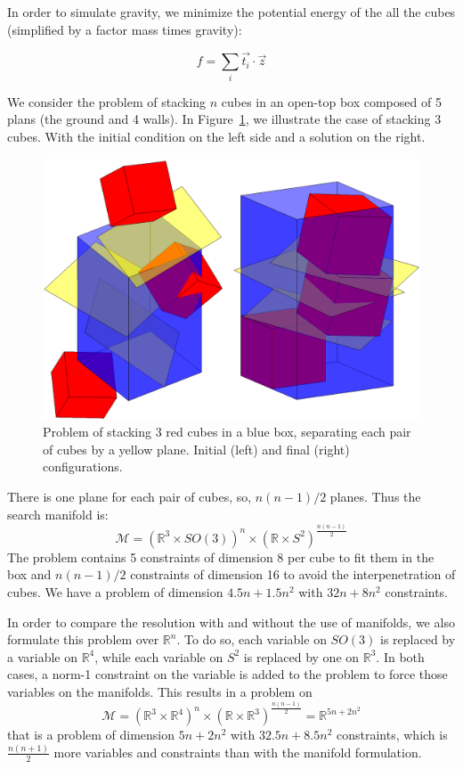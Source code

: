 In order to simulate gravity, we minimize the potential energy of the all the cubes (simplified by a factor mass times gravity):

\begin{equation}
  f = \sum\limits_i \vec{t_i}\cdot \vec{z}
\end{equation}

We consider the problem of stacking $n$ cubes in an open-top box composed of 5 plans (the ground and 4 walls).
In Figure~\ref{fig:cubes}, we illustrate the case of stacking 3 cubes.
With the initial condition on the left side and a solution on the right.
\begin{figure}
\centering
  \includegraphics[width=.8\linewidth]{3cubes.png}
  \caption{Problem of stacking 3 red cubes in a blue box, separating each pair of cubes by a yellow plane. Initial (left) and final (right) configurations.}
\label{fig:cubes}
\end{figure}

There is one plane for each pair of cubes, so, $n(n-1)/2$ planes.
Thus the search manifold is:
\begin{equation}
  \mathcal{M} = {\left( \mathbb{R}^3\times SO(3) \right)}^n \times {\left( \mathbb{R} \times S^2 \right)}^{\frac{n(n-1)}{2}} \nonumber
\end{equation}
The problem contains 5 constraints of dimension 8 per cube to fit them in the box and $n(n-1)/2$ constraints of dimension 16 to avoid the interpenetration of cubes.
We have a problem of dimension $4.5n+1.5n^2$ with $32n+8n^2$ constraints.

In order to compare the resolution with and without the use of manifolds, we also formulate this problem over $\mathbb{R}^n$.
To do so, each variable on $SO(3)$ is replaced by a variable on $\mathbb{R}^4$, while each variable on $S^2$ is replaced by one on $\mathbb{R}^3$.
In both cases, a norm-1 constraint on the variable is added to the problem to force those variables on the manifolds.
This results in a problem on
\begin{equation}
  \mathcal{M}={\left( \mathbb{R}^3\times \mathbb{R}^4 \right)}^n \times {\left( \mathbb{R} \times \mathbb{R}^3 \right)}^{\frac{n(n-1)}{2}} = \mathbb{R}^{5n+2n^2} \nonumber
\end{equation}
that is a problem of dimension $5n+2n^2$ with $32.5n+8.5n^2$ constraints, which is $\frac{n(n+1)}{2}$ more variables and constraints than with the manifold formulation.

